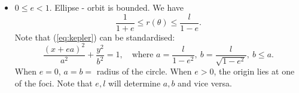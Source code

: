 \begin{itemize}
    \item $ 0\le e<1 $. Ellipse - orbit is bounded. We have 
    \[
        \frac{1}{1+e}\le r(\theta)\le \frac{l}{1-e}.
    \]
    Note that (\ref{eq:kepler}) can be standardised:
    \[
        \frac{(x+ea)^2}{a^2}+\frac{y^2}{b^2}=1,\quad \text{where }a = \frac{l}{1-e^2},\ b=\frac{l}{\sqrt{1-e^2}},\ b\le a.
    \]
    When $e=0$, $a=b=$ radius of the circle. When $e>0$, the origin lies at one of the foci. Note that $e,l$ will determine $a,b$ and vice versa.
    \begin{center}
\end{center}
\end{itemize}
